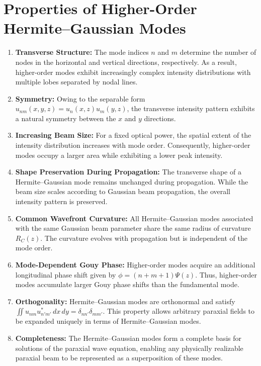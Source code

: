 \documentclass{report}
\begin{document}
\section{Properties of Higher-Order Hermite--Gaussian Modes}
\begin{enumerate}
    \item \textbf{Transverse Structure:}  
    The mode indices $n$ and $m$ determine the number of nodes in the horizontal and vertical directions, respectively. As a result, higher-order modes exhibit increasingly complex intensity distributions with multiple lobes separated by nodal lines.

    \item \textbf{Symmetry:}  
    Owing to the separable form $u_{nm}(x,y,z)=u_n(x,z)u_m(y,z)$,
    the transverse intensity pattern exhibits a natural symmetry between the $x$ and $y$ directions.

    \item \textbf{Increasing Beam Size:}  
    For a fixed optical power, the spatial extent of the intensity distribution increases with mode order. Consequently, higher-order modes occupy a larger area while exhibiting a lower peak intensity.

    \item \textbf{Shape Preservation During Propagation:}  
    The transverse shape of a Hermite--Gaussian mode remains unchanged during propagation. While the beam size scales according to Gaussian beam propagation, the overall intensity pattern is preserved.

    \item \textbf{Common Wavefront Curvature:}  
    All Hermite--Gaussian modes associated with the same Gaussian beam parameter share the same radius of curvature $R_C(z)$. The curvature evolves with propagation but is independent of the mode order.

    \item \textbf{Mode-Dependent Gouy Phase:}  
    Higher-order modes acquire an additional longitudinal phase shift given by $\phi=(n+m+1)\Psi(z)$. Thus, higher-order modes accumulate larger Gouy phase shifts than the fundamental mode.

    \item \textbf{Orthogonality:}  
    Hermite--Gaussian modes are orthonormal and satisfy
    $
    \iint u_{nm}u_{n'm'}^{*}\,dx\,dy
    =
    \delta_{nn'}\delta_{mm'}.
    $    This property allows arbitrary paraxial fields to be expanded uniquely in terms of Hermite--Gaussian modes.

    \item \textbf{Completeness:}  
    The Hermite--Gaussian modes form a complete basis for solutions of the paraxial wave equation, enabling any physically realizable paraxial beam to be represented as a superposition of these modes.
\end{enumerate}
\end{document}
